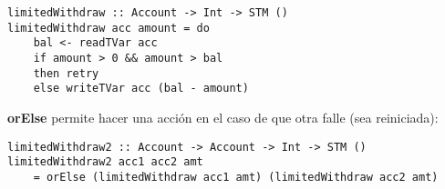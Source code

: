 \begin{lstlisting}
limitedWithdraw :: Account -> Int -> STM ()
limitedWithdraw acc amount = do
    bal <- readTVar acc
    if amount > 0 && amount > bal
    then retry
    else writeTVar acc (bal - amount)
\end{lstlisting}

\textbf{orElse} permite hacer una acción en el caso de que otra falle (sea reiniciada):

\begin{lstlisting}
limitedWithdraw2 :: Account -> Account -> Int -> STM ()
limitedWithdraw2 acc1 acc2 amt
    = orElse (limitedWithdraw acc1 amt) (limitedWithdraw acc2 amt)
\end{lstlisting}


